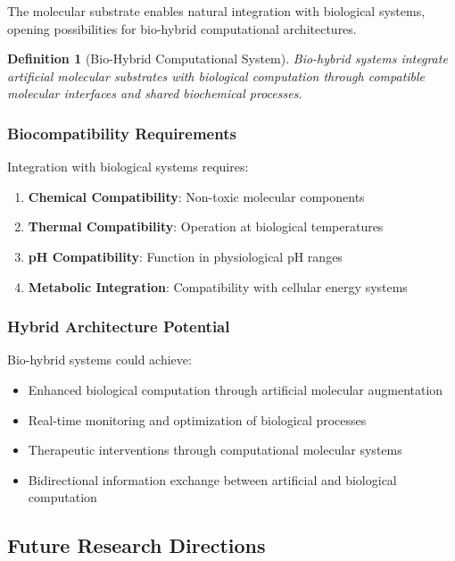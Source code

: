 \documentclass[12pt,a4paper]{article}
\newtheorem{definition}[theorem]{Definition}
\begin{document}
The molecular substrate enables natural integration with biological systems, opening possibilities for bio-hybrid computational architectures.

\begin{definition}[Bio-Hybrid Computational System]
Bio-hybrid systems integrate artificial molecular substrates with biological computation through compatible molecular interfaces and shared biochemical processes.
\end{definition}

\subsubsection{Biocompatibility Requirements}

Integration with biological systems requires:

\begin{enumerate}
\item \textbf{Chemical Compatibility}: Non-toxic molecular components
\item \textbf{Thermal Compatibility}: Operation at biological temperatures
\item \textbf{pH Compatibility}: Function in physiological pH ranges
\item \textbf{Metabolic Integration}: Compatibility with cellular energy systems
\end{enumerate}

\subsubsection{Hybrid Architecture Potential}

Bio-hybrid systems could achieve:

\begin{itemize}
\item Enhanced biological computation through artificial molecular augmentation
\item Real-time monitoring and optimization of biological processes
\item Therapeutic interventions through computational molecular systems
\item Bidirectional information exchange between artificial and biological computation
\end{itemize}

\subsection{Future Research Directions}
\end{document}

